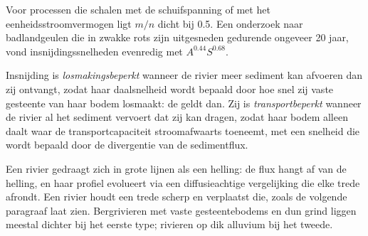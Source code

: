 Voor processen die schalen met de schuifspanning of met het eenheidsstroomvermogen
ligt $m/n$ dicht bij 0.5. Een onderzoek naar badlandgeulen die in zwakke rots
zijn uitgesneden gedurende ongeveer 20 jaar, vond insnijdingssnelheden evenredig met $A^{0.44}S^{0.68}$.

\begin{definition}\label{def:b3:quantitative-geomorphology:limited}
Insnijding is \emph{losmakingsbeperkt}
wanneer de rivier meer sediment kan afvoeren dan zij ontvangt, zodat haar
daalsnelheid wordt bepaald door hoe snel zij vaste gesteente van haar bodem losmaakt: de
 geldt dan. Zij is
\emph{transportbeperkt} wanneer de rivier al het
sediment vervoert dat zij kan dragen, zodat haar bodem alleen daalt waar de
transportcapaciteit stroomafwaarts toeneemt, met een snelheid die wordt bepaald door
de divergentie van de sedimentflux.
\end{definition}

Een  rivier gedraagt zich in grote lijnen als een helling: de flux hangt
af van de helling, en haar profiel evolueert via een diffusieachtige vergelijking die
elke trede afrondt. Een  rivier houdt een trede scherp en verplaatst die,
zoals de volgende paragraaf laat zien. Bergrivieren met vaste gesteentebodems en dun
grind liggen meestal dichter bij het eerste type; rivieren op dik alluvium bij het
tweede.


